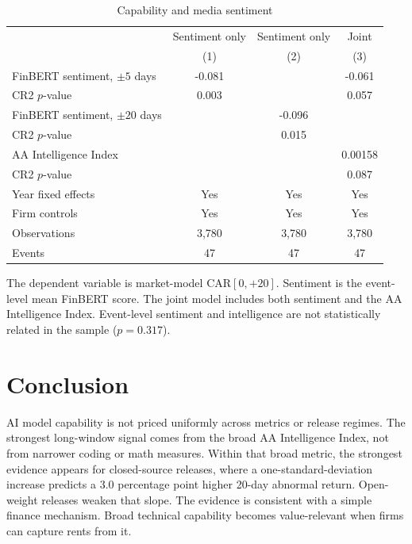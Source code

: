 \documentclass[12pt]{article}
\begin{document}
\begin{table}[htbp]
\centering
\caption{Capability and media sentiment}
\label{tab:sent}
\begin{threeparttable}
\begin{tabular}{lccc}
\toprule
 & Sentiment only & Sentiment only & Joint \\
 & (1) & (2) & (3) \\
\midrule
FinBERT sentiment, $\pm 5$ days & -0.081 &  & -0.061 \\
CR2 $p$-value & 0.003 &  & 0.057 \\
\addlinespace
FinBERT sentiment, $\pm 20$ days &  & -0.096 &  \\
CR2 $p$-value &  & 0.015 &  \\
\addlinespace
AA Intelligence Index &  &  & 0.00158 \\
CR2 $p$-value &  &  & 0.087 \\
\addlinespace
Year fixed effects & Yes & Yes & Yes \\
Firm controls & Yes & Yes & Yes \\
Observations & 3,780 & 3,780 & 3,780 \\
Events & 47 & 47 & 47 \\
\bottomrule
\end{tabular}
\begin{tablenotes}[flushleft]\footnotesize
\item The dependent variable is market-model CAR$[0,{+}20]$. Sentiment is the
event-level mean FinBERT score. The joint model includes both sentiment and the
AA Intelligence Index. Event-level sentiment and intelligence are not
statistically related in the sample ($p=0.317$).
\end{tablenotes}
\end{threeparttable}
\end{table}

\section{Conclusion}
\label{sec:conclusion}

AI model capability is not priced uniformly across metrics or release regimes.
The strongest long-window signal comes from the broad AA Intelligence Index, not
from narrower coding or math measures. Within that broad metric, the strongest
evidence appears for closed-source releases, where a one-standard-deviation
increase predicts a 3.0 percentage point higher 20-day abnormal return.
Open-weight releases weaken that slope. The evidence is consistent with a simple
finance mechanism. Broad technical capability becomes value-relevant when firms
can capture rents from it.
\end{document}
